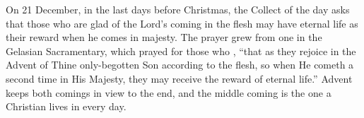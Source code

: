 On 21 December, in the last days before Christmas, the Collect of the day
asks that those who are glad of the Lord's coming in the flesh may have eternal
life as their reward when he comes in majesty. The prayer grew from one in the Gelasian Sacramentary, which prayed for those who
, ``that as they rejoice in
the Advent of Thine only-begotten Son according to the flesh, so when He cometh a
second time in His Majesty, they may receive the reward of eternal life.'' Advent keeps both comings in
view to the end, and the middle coming is the one a Christian lives in every
day.
